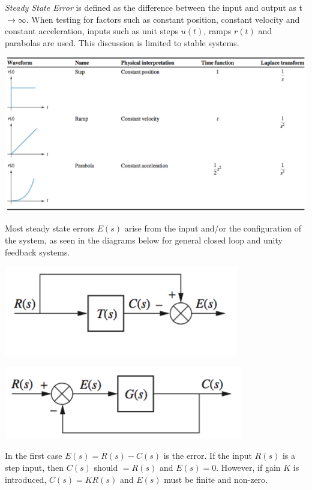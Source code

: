 \documentclass[11pt]{article}
\begin{document}
    \textit{Steady State Error} is defined as the difference between the input and output as t $\rightarrow \infty$. When testing for factors such as constant position, constant velocity and constant acceleration, inputs such as unit steps $u(t)$, ramps $r(t)$ and parabolas are used. This discussion is limited to stable systems.\\
   
    \begin{center}
        \includegraphics[width=300 px]{img/inputs} \\
    \end{center}

    Most steady state errors $E(s)$ arise from the input and/or the configuration of the system, as seen in the diagrams below for general closed loop and unity feedback systems.

    \begin{center}
        \includegraphics[width=300 px]{img/closedlooperror} \\
    \end{center}

    \begin{center}
        \includegraphics[width=300 px]{img/unityfeedback} \\
    \end{center}
    
    In the first case $E(s) = R(s) - C(s)$ is the error. If the input $R(s)$ is a step input, then $C(s)$ should $= R(s)$ and $E(s) = 0$. However, if gain $K$ is introduced, $C(s) = KR(s)$ and $E(s)$ must be finite and non-zero. \\
    
\end{document}
